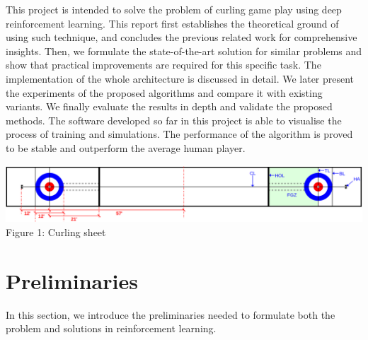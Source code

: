 \documentclass[oneside,11pt,a4paper]{article}
\begin{document}
\newline
\newline
\noindent
This project is intended to solve the problem of curling game play using deep reinforcement learning. This report first establishes the theoretical ground of using such technique, and concludes the previous related work for comprehensive insights. Then, we formulate the state-of-the-art solution for similar problems and show that practical improvements are required for this specific task. The implementation of the whole architecture is discussed in detail. We later present the experiments of the proposed algorithms and compare it with existing variants. We finally evaluate the results in depth and validate the proposed methods. The software developed so far in this project is able to visualise the process of training and simulations. The performance of the algorithm is proved to be stable and outperform the average human player.
\vspace{2cm}
\begin{center}
    \includegraphics[scale=.15]{curling.png}\\
    Figure 1: Curling sheet \cite{curlingmap}
\end{center}

\newpage
\section{Preliminaries}
In this section, we introduce the preliminaries needed to formulate both the problem and solutions in reinforcement learning.
\end{document}
